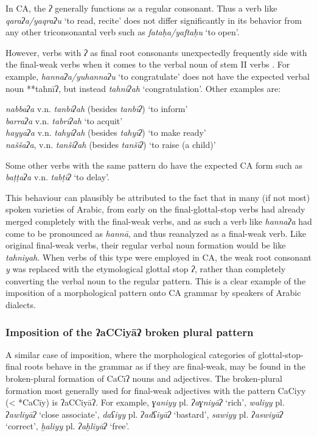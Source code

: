 \documentclass[output=paper]{langsci/langscibook}
\begin{document}
In CA, the \textit{ʔ} generally functions as a regular consonant. Thus a verb like \textit{qaraʔa/yaqraʔu} ‘to read, recite’ does not differ significantly in its behavior from any other triconsonantal verb such as \textit{fataḥa/yaftaḥu} ‘to open’. 

However, verbs with \textit{ʔ} as final root consonants unexpectedly frequently side with the final-weak verbs when it comes to the verbal noun of stem II verbs \citep[128]{Fischer2002}. For example, \textit{hannaʔa/yuhannaʔu} ‘to congratulate’ does not have the expected verbal noun **tahnīʔ, but instead \textit{tahniʔah} ‘congratulation’. Other examples are:

\ea
\ea\textit{nabbaʔa} v.n. \textit{tanbiʔah} (besides \textit{tanbīʔ}) ‘to inform’\\
\ex\textit{barraʔa} v.n. \textit{tabriʔah} ‘to acquit’\\
\ex\textit{hayyaʔa} v.n. \textit{tahyiʔah} (besides \textit{tahyīʔ}) ‘to make ready’\\
\ex\textit{naššaʔa}, v.n. \textit{tanšiʔah} (besides \textit{tanšīʔ}) ‘to raise (a child)’
\z
\z

Some other verbs with the same pattern do have the expected CA form such as \textit{baṭṭaʔa} v.n. \textit{tabṭīʔ} ‘to delay’.

This behaviour can plausibly be attributed to the fact that in many (if not most) spoken varieties of Arabic, from early on the final-glottal-stop verbs had already merged completely with the final-weak verbs, and as such a verb like \textit{hannaʔa} had come to be pronounced as \textit{hannā}, and thus reanalyzed as a final-weak verb. Like original final-weak verbs, their regular verbal noun formation would be like \textit{tahniyah}. When verbs of this type were employed in CA, the weak root consonant \textit{y} was replaced with the etymological glottal stop \textit{ʔ}, rather than completely converting the verbal noun to the regular pattern. This is a clear example of the imposition of a morphological pattern onto CA grammar by speakers of Arabic dialects.

\subsubsection{\label{bkm:Ref13224796}Imposition of the ʔaCCiyāʔ broken plural pattern}

A similar case of imposition, where the morphological categories of glottal-stop-final roots behave in the grammar as if they are final-weak, may be found in the broken-plural formation of CaCīʔ nouns and adjectives. The broken-plural formation most generally used for final-weak adjectives with the pattern CaCiyy (< *CaCīy) is ʔaCCiyāʔ. For example, \textit{ɣaniyy} pl. \textit{ʔaɣniyāʔ} ‘rich’, \textit{waliyy} pl. \textit{ʔawliyāʔ} ‘close associate’, \textit{daʕiyy} pl. \textit{ʔadʕiyāʔ} ‘bastard’, \textit{sawiyy} pl. \textit{ʔaswiyāʔ} ‘correct’, \textit{ḫaliyy} pl. \textit{ʔaḫliyāʔ} ‘free’.
\end{document}
